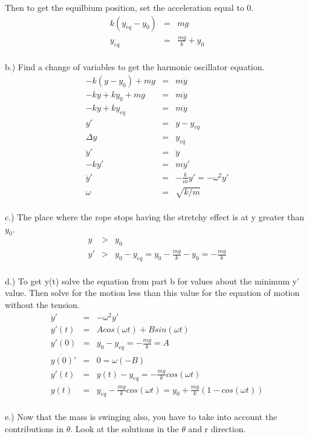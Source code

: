 \documentclass[11pt]{amsart}
\begin{document}
Then to get the equilbium position, set the acceleration equal to 0. \\
\begin{eqnarray*}
k(y_{eq}-y_{0}) &=& mg \\
y_{eq} &=& \frac{mg}{k}+y_{0} 
\end{eqnarray*} \\
b.) Find a change of variables to get the harmonic oscillator equation. \\
\begin{eqnarray*}
-k(y-y_{0})+mg &=& m\ddot{y} \\
-ky +ky_{0}+mg &=& m\ddot{y} \\
-ky+ky_{eq} &=& m\ddot{y} \\
y' &=& y -y_{eq} \\
\Delta{y} &=& y_{eq} \\
\ddot{y}' &=& \ddot{y} \\
-ky' &=& m\ddot{y}' \\
\ddot{y}' &=& -\frac{k}{m}y' = -\omega^{2}y' \\
\omega &=& \sqrt{k/m} 
\end{eqnarray*} \\
c.) The place where the rope stops having the stretchy effect is at y greater than $y_{0}$. \\
\begin{eqnarray*}
y &>& y_{0} \\
y' &>& y_{0}-y_{eq} =y_{0}-\frac{mg}{k}-y_{0}  = -\frac{mg}{k} 
\end{eqnarray*} \\
d.) To get y(t) solve the equation from part b for values about the minimum y' value. Then solve for the motion less than this value for the equation of motion without the tension. \\
\begin{eqnarray*}
\ddot{y}' &=& -\omega^{2}y' \\
y'(t) &=& Acos(\omega{t})+Bsin(\omega{t}) \\
y'(0) &=& y_{0}-y_{eq} = -\frac{mg}{k} =A \\
\dot{y(0)}' &=& 0 = \omega(-B) \\
y'(t) &=& y(t)-y_{eq} = -\frac{mg}{k}cos(\omega{t}) \\
y(t) &=& y_{eq} -\frac{mg}{k}cos(\omega{t}) = y_{0} +\frac{mg}{k}(1-cos(\omega{t}) ) 
\end{eqnarray*} \\
e.) Now that the mass is swinging also, you have to take into account the contributions in $\theta$. Look at the solutions in the $\theta$ and r direction. \\
\end{document}
